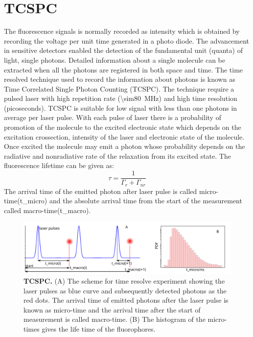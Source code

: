 \section{TCSPC}
The fluorescence signals is normally recorded as intensity which is obtained by recording the voltage per unit time generated in a photo diode.
The advancement in sensitive detectors enabled the detection of the fundamental unit (quanta) of light, single photons.
Detailed information about a single molecule can be extracted when all the photons are registered in both space and time.
The time resolved technique used to record the information about photons is known as Time Correlated Single Photon Counting (TCSPC).\cite{oconnor2012timecorrelated,birch2002topics}
The technique require a pulsed laser with high repetition rate (\SI{\sim80}{\MHz}) and high time resolution (picoseconds).
TCSPC is suitable for low signal with less than one photons in average per laser pulse.
With each pulse of laser there is a probability of promotion of the molecule to the excited electronic state which depends on the excitation crossection, intensity of the laser and electronic state of the molecule.
Once excited the molecule may emit a photon whose probability depends on the radiative and nonradiative rate of the relaxation from its excited state.
The fluorescence lifetime can be given as:
\begin{equation}
	\tau = \frac{1}{\Gamma_{r} + \Gamma_{nr}}
\end{equation}
The arrival time of the emitted photon after laser pulse is called micro-time(t\_micro) and the absolute arrival time from the start of the measurement called macro-time(t\_macro).
\begin{figure}
	\centering
	\includegraphics[width=\textwidth]{tcspc_sch}
	\caption{\textbf{TCSPC.} (A) The scheme for time resolve experiment showing the laser pulses as blue curve and subsequently detected photons as the red dots.
	The arrival time of emitted photons after the laser pulse is known as micro-time and the arrival time after the start of measurement is called macro-time.
	(B) The histogram of the micro-times gives the life time of the fluorophores.}
	\label{fig:tcspc_sch}
\end{figure}
